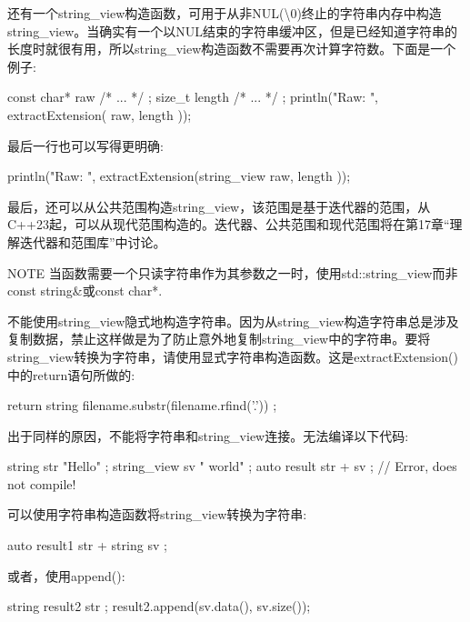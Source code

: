 还有一个string\_view构造函数，可用于从非NUL(\textbackslash{}0)终止的字符串内存中构造string\_view。当确实有一个以NUL结束的字符串缓冲区，但是已经知道字符串的长度时就很有用，所以string\_view构造函数不需要再次计算字符数。下面是一个例子:

\begin{cpp}
const char* raw { /* ... */ };
size_t length { /* ... */ };
println("Raw: {}", extractExtension({ raw, length }));
\end{cpp}

最后一行也可以写得更明确:

\begin{cpp}
println("Raw: {}", extractExtension(string_view { raw, length }));
\end{cpp}

最后，还可以从公共范围构造string\_view，该范围是基于迭代器的范围，从C++23起，可以从现代范围构造的。迭代器、公共范围和现代范围将在第17章“理解迭代器和范围库”中讨论。

\begin{myNotic}{NOTE}
当函数需要一个只读字符串作为其参数之一时，使用std::string\_view而非const string\&或const char*.
\end{myNotic}

不能使用string\_view隐式地构造字符串。因为从string\_view构造字符串总是涉及复制数据，禁止这样做是为了防止意外地复制string\_view中的字符串。要将string\_view转换为字符串，请使用显式字符串构造函数。这是extractExtension()中的return语句所做的:

\begin{cpp}
return string { filename.substr(filename.rfind('.')) };
\end{cpp}

出于同样的原因，不能将字符串和string\_view连接。无法编译以下代码:

\begin{cpp}
string str { "Hello" };
string_view sv { " world" };
auto result { str + sv }; // Error, does not compile!
\end{cpp}

可以使用字符串构造函数将string\_view转换为字符串:

\begin{cpp}
auto result1 { str + string { sv } };
\end{cpp}

或者，使用append():

\begin{cpp}
string result2 { str };
result2.append(sv.data(), sv.size());
\end{cpp}

